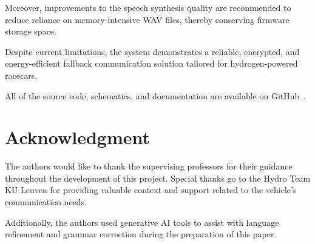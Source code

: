 \documentclass[conference]{IEEEtran}
\begin{document}
Moreover, improvements to the speech synthesis quality are recommended to reduce reliance on memory-intensive WAV files, thereby conserving firmware storage space.

Despite current limitations, the system demonstrates a reliable, encrypted, and energy-efficient fallback communication solution tailored for hydrogen-powered racecars.

All of the source code, schematics, and documentation are available on GitHub~\cite{Hydro Backup System - Organization}.

\section*{Acknowledgment}
The authors would like to thank the supervising professors for their guidance throughout the development of this project. Special thanks go to the Hydro Team KU Leuven for providing valuable context and support related to the vehicle's communication needs. 

Additionally, the authors used generative AI tools to assist with language refinement and grammar correction during the preparation of this paper.


\end{document}

